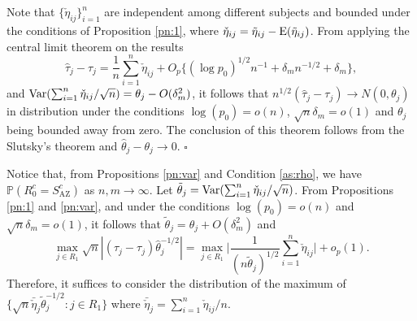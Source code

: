 \documentclass[12pt]{article}
\def\nn{\nonumber}
\def\T{{ \mathrm{\scriptscriptstyle T} }}
\def\AZ{{ \mathrm{\scriptscriptstyle AZ} }}
\theoremstyle{definition}
\newcommand{\E}{\rm E}
\newcommand{\V}{\rm Var}
\newcommand{\bW}{{\mathbf W}}
\newcommand{\bXi}{\boldsymbol{\Xi}}
\begin{document}
\medskip
{}
Note that $\{\check{\eta}_{ij}\}_{i = 1}^{n}$ are independent among different subjects and bounded under the conditions of Proposition \ref{pn:1}, where $\check{\eta}_{ij} = \tilde{\eta}_{ij} - {\E}(\tilde{\eta}_{ij})$.
From applying the central limit theorem on the results
$$\hat{\tau}_{j} - \tau_{j}
= 
\frac{1}{n}\sum_{i = 1}^{n} \check{\eta}_{ij}
+ 
O_{p}\{(\log p_0)^{1/2}n^{-1} + \delta_m n^{-1/2} + \delta_m\},$$
and ${\V}(\sum_{i = 1}^{n}\check{\eta}_{ij} / \sqrt{n}) = \theta_j - O(\delta_m^2)$, it follows that $n^{1/2}(\hat{\tau}_j - \tau_j) \to N(0, \theta_j)$ in distribution under the conditions $\log (p_0) = o(n)$, $\sqrt{n} \delta_m = o(1)$ and $\theta_j$ being bounded away from zero.
The conclusion of this theorem follows from the Slutsky's theorem and $\hat{\theta}_j - \theta_j \to 0$.
$\square$

\medskip
{}
Notice that, from Propositions \ref{pn:var} and Condition \ref{as:rho}, we have $\mathbb{P}(R_0^c = S_{\AZ}^c)$ as $n, m \to \infty$.
Let $\tilde{\theta}_j = {\V}(\sum_{i = 1}^{n}\check{\eta}_{ij} / \sqrt{n})$.
From Propositions \ref{pn:1} and \ref{pn:var}, and under the conditions $\log(p_0) = o(n)$ and $\sqrt{n} \delta_m = o(1)$, it follows that $\tilde{\theta}_j = \theta_j + O(\delta_m^2)$ and 
$$\max_{j \in R_{1}} \sqrt{n}| (\hat{\tau}_{j} - \tau_j) \hat{\theta}_{j}^{-1/2} | = \max_{j \in R_{1}} \bigg|\frac{1}{(n \tilde{\theta}_{j})^{1/2}}\sum_{i = 1}^{n}\check{\eta}_{ij}\bigg| + o_{p}(1).$$ Therefore, it suffices to consider the distribution of the maximum of $\{\sqrt{n} \bar{\check\eta}_{j}\tilde{\theta}_j^{-1/2}: j \in R_1\}$ where $\bar{\check\eta}_{j} = \sum_{i = 1}^{n} \check{\eta}_{ij} / n$.
\end{document}

